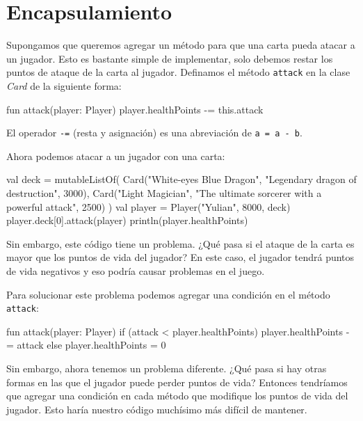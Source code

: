 
\section{Encapsulamiento}
  Supongamos que queremos agregar un método para que una carta pueda atacar a un jugador.
  Esto es bastante simple de implementar, solo debemos restar los puntos de ataque de la carta
  al jugador.
  Definamos el método \texttt{attack} en la clase \textit{Card} de la siguiente forma:

  \begin{kotlin}
    fun attack(player: Player) {
      player.healthPoints -= this.attack
    }
  \end{kotlin}

  \begin{note}
    El operador \texttt{-=} (resta y asignación) es una abreviación de \texttt{a = a - b}.
  \end{note}

  Ahora podemos atacar a un jugador con una carta:

  \begin{kotlin}
    val deck = mutableListOf(
      Card("White-eyes Blue Dragon", "Legendary dragon of destruction", 3000),
      Card("Light Magician", "The ultimate sorcerer with a powerful attack", 2500)
    )
    val player = Player("Yulian", 8000, deck)
    player.deck[0].attack(player)
    println(player.healthPoints)
  \end{kotlin}

  Sin embargo, este código tiene un problema.
  ¿Qué pasa si el ataque de la carta es mayor que los puntos de vida del jugador?
  En este caso, el jugador tendrá puntos de vida negativos y eso podría causar problemas en el
  juego.

  Para solucionar este problema podemos agregar una condición en el método \texttt{attack}:

  \begin{kotlin}
    fun attack(player: Player) {
      if (attack < player.healthPoints) {
        player.healthPoints -= attack
      } else {
        player.healthPoints = 0
      }
    }
  \end{kotlin}

  Sin embargo, ahora tenemos un problema diferente.
  ¿Qué pasa si hay otras formas en las que el jugador puede perder puntos de vida?
  Entonces tendríamos que agregar una condición en cada método que modifique los puntos de vida
  del jugador.
  Esto haría nuestro código muchísimo más difícil de mantener.

